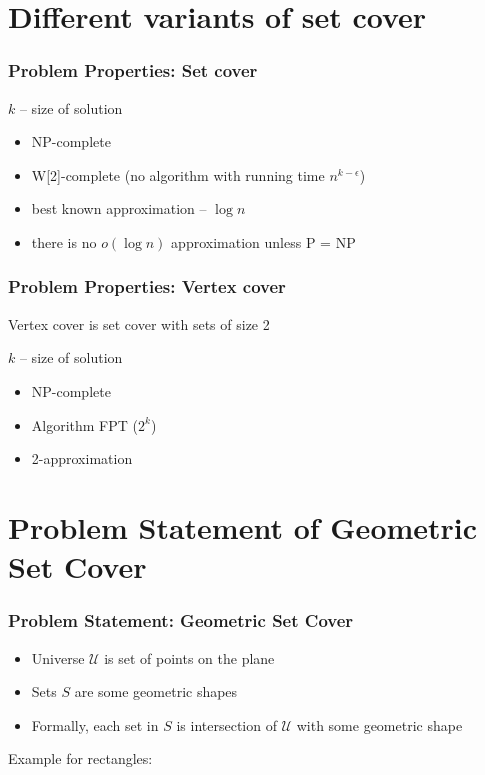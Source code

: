 \documentclass{beamer}
\begin{document}
\section{Different variants of set cover}
\begin{frame}
\frametitle{Problem Properties: Set cover}
$k$ -- size of solution
\begin{itemize}
\item NP-complete
\item W[2]-complete (no algorithm with running time $n^{k-\epsilon}$)
\item best known approximation -- $\log n$
\item there is no $o(\log n)$ approximation unless P = NP
\end{itemize}


\end{frame}

\begin{frame}
\frametitle{Problem Properties: Vertex cover}
Vertex cover is set cover with sets of size 2

$k$ -- size of solution
\begin{itemize}
\item NP-complete
\item Algorithm FPT ($2^k$)
\item 2-approximation
\end{itemize}


\end{frame}

\section{Problem Statement of Geometric Set Cover}

\begin{frame}
\frametitle{Problem Statement: Geometric Set Cover}
\begin{itemize}
\item Universe $\mathcal{U}$ is set of points on the plane
\item Sets $S$ are some geometric shapes
\item Formally, each set in $S$ is intersection of $\mathcal{U}$
with some geometric shape
\end{itemize}

Example for rectangles:




\end{frame}
\end{document}
